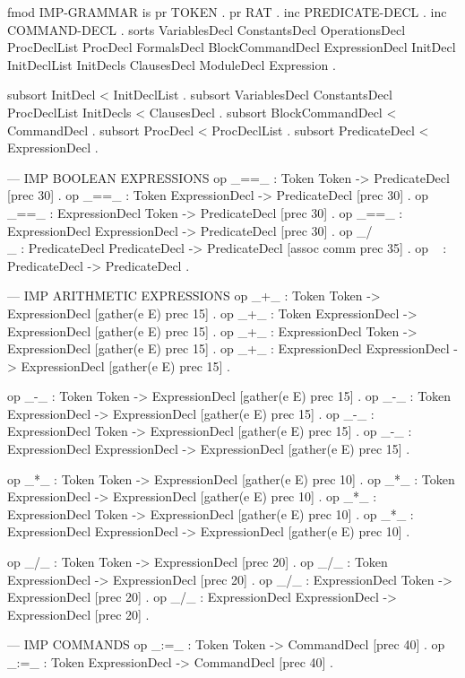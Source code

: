 \documentclass{llncs}%
\begin{document}
fmod IMP-GRAMMAR is
    pr TOKEN .
    pr RAT .
    inc PREDICATE-DECL .
          inc COMMAND-DECL .
    sorts VariablesDecl ConstantsDecl OperationsDecl ProcDeclList
        ProcDecl FormalsDecl BlockCommandDecl ExpressionDecl
        InitDecl InitDeclList InitDecls ClausesDecl
        ModuleDecl Expression .

    subsort InitDecl < InitDeclList .
    subsort VariablesDecl ConstantsDecl ProcDeclList InitDecls < ClausesDecl .
          subsort BlockCommandDecl < CommandDecl .
    subsort ProcDecl < ProcDeclList .
    subsort PredicateDecl < ExpressionDecl .

    --- IMP BOOLEAN EXPRESSIONS
    op _==_ : Token Token -> PredicateDecl [prec 30] .
    op _==_ : Token ExpressionDecl -> PredicateDecl [prec 30] .
    op _==_ : ExpressionDecl Token -> PredicateDecl [prec 30] .
    op _==_ : ExpressionDecl ExpressionDecl -> PredicateDecl [prec 30] .
    op _/\\_ : PredicateDecl PredicateDecl -> PredicateDecl [assoc comm prec 35] .
    op ~ : PredicateDecl -> PredicateDecl .

        --- IMP ARITHMETIC EXPRESSIONS
    op _+_ : Token Token -> ExpressionDecl [gather(e E) prec 15] .
    op _+_ : Token ExpressionDecl -> ExpressionDecl [gather(e E) prec 15] .
    op _+_ : ExpressionDecl Token -> ExpressionDecl [gather(e E) prec 15] .
    op _+_ : ExpressionDecl ExpressionDecl -> ExpressionDecl [gather(e E) prec 15] .

    op _-_ : Token Token -> ExpressionDecl  [gather(e E) prec 15] .
    op _-_ : Token ExpressionDecl -> ExpressionDecl [gather(e E) prec 15] .
    op _-_ : ExpressionDecl Token -> ExpressionDecl [gather(e E) prec 15] .
    op _-_ : ExpressionDecl ExpressionDecl -> ExpressionDecl [gather(e E) prec 15] .

    op _*_ : Token Token -> ExpressionDecl [gather(e E) prec 10] .
    op _*_ : Token ExpressionDecl -> ExpressionDecl [gather(e E) prec 10] .
    op _*_ : ExpressionDecl Token -> ExpressionDecl [gather(e E) prec 10] .
    op _*_ : ExpressionDecl ExpressionDecl -> ExpressionDecl [gather(e E) prec 10] .

    op _/_ : Token Token -> ExpressionDecl [prec 20] .
    op _/_ : Token ExpressionDecl -> ExpressionDecl [prec 20] .
    op _/_ : ExpressionDecl Token -> ExpressionDecl [prec 20] .
    op _/_ : ExpressionDecl ExpressionDecl -> ExpressionDecl [prec 20] .

    --- IMP COMMANDS
    op _:=_ : Token Token -> CommandDecl [prec 40] .
    op _:=_ : Token ExpressionDecl -> CommandDecl [prec 40] .
\end{document}

